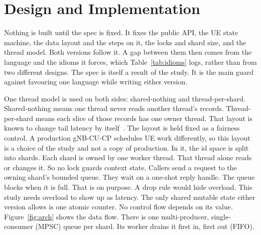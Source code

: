 \documentclass[english,oneside,a4paper,censored,csm,software-track-2020]{HYthesisML}
\begin{document}
\chapter{Design and Implementation\label{chapter:design}}

Nothing is built until the spec is fixed. It fixes the public API, the UE
state machine, the data layout and the steps on it, the locks and shard size,
and the thread model. Both versions follow it. A gap between them then comes
from the language and the idioms it forces, which Table~\ref{tab:idioms} logs,
rather than from two different designs. The spec is itself a result of
the study. It is the main guard against favouring one language while writing either version.

One thread model is used on both sides: shared-nothing and thread-per-shard.
Shared-nothing means one thread never reads another thread’s records. Thread-per-shard means
each slice of those records has one owner thread.
That layout is known to change tail latency by
itself~\cite{enberg2019threadpercore}. The layout is held fixed as a fairness
control. A production gNB-CU-CP schedules UE work differently, so this layout is a choice
of the study and not a copy of production. In it, the id space is split into shards. Each
shard is owned by one worker thread. That thread alone reads or changes it.
So no lock guards context state. Callers send a request to the owning shard's
bounded queue. They wait on a one-shot reply handle. The queue blocks when it
is full. That is on purpose. A drop rule would hide overload. This study needs
overload to show up as latency. The only shared mutable state either version
allows is one atomic counter. No control flow depends on its value.
Figure~\ref{fig:arch} shows the data flow. There is one multi-producer,
single-consumer (MPSC) queue per shard. Its worker drains it first in, first
out (FIFO).
\end{document}
